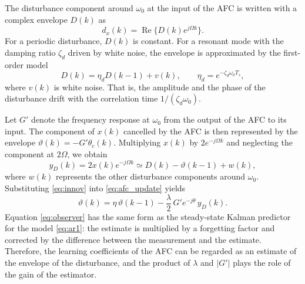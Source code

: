 \documentclass[conference]{IEEEtran}
\newcommand{\Ts}{T_s}
\newcommand{\thc}{\theta_c}              %
\newcommand{\etad}{\eta_d}               %
\newcommand{\Gp}{G'}                     %
\newcommand{\re}{\operatorname{Re}}
\begin{document}
The disturbance component around $\omega_0$ at the input of the AFC is written
with a complex envelope $D(k)$ as
\begin{equation}
d_x(k) = \re\{D(k) e^{j\Omega k}\}.
\end{equation}
For a periodic disturbance, $D(k)$ is constant. For a resonant mode with the
damping ratio $\zeta_d$ driven by white noise, the envelope is approximated by
the first-order model
\begin{equation}
D(k) = \etad D(k-1) + v(k), \qquad \etad = e^{-\zeta_d \omega_0 \Ts},
\label{eq:ar1}
\end{equation}
where $v(k)$ is white noise. That is, the amplitude and the phase of the
disturbance drift with the correlation time $1/(\zeta_d \omega_0)$.

Let $\Gp$ denote the frequency response at $\omega_0$ from the output of the
AFC to its input. The component of $x(k)$ cancelled by the AFC is then
represented by the envelope $\vartheta(k) = -\Gp \thc(k)$. Multiplying $x(k)$
by $2e^{-j\Omega k}$ and neglecting the component at $2\Omega$, we obtain
\begin{equation}
y_D(k) = 2x(k) e^{-j\Omega k} \simeq D(k) - \vartheta(k-1) + w(k),
\label{eq:innov}
\end{equation}
where $w(k)$ represents the other disturbance components around $\omega_0$.
Substituting \eqref{eq:innov} into \eqref{eq:afc_update} yields
\begin{equation}
\vartheta(k) = \eta\,\vartheta(k-1)
 - \frac{\lambda}{2}\,\Gp e^{-j\theta}\, y_D(k).
\label{eq:observer}
\end{equation}
Equation \eqref{eq:observer} has the same form as the steady-state Kalman
predictor \cite{anderson1979} for the model \eqref{eq:ar1}: the estimate is
multiplied by a forgetting factor and corrected by the difference between the
measurement and the estimate. Therefore, the learning coefficients of the AFC
can be regarded as an estimate of the envelope of the disturbance, and the
product of $\lambda$ and $|\Gp|$ plays the role of the gain of the estimator.
\end{document}
